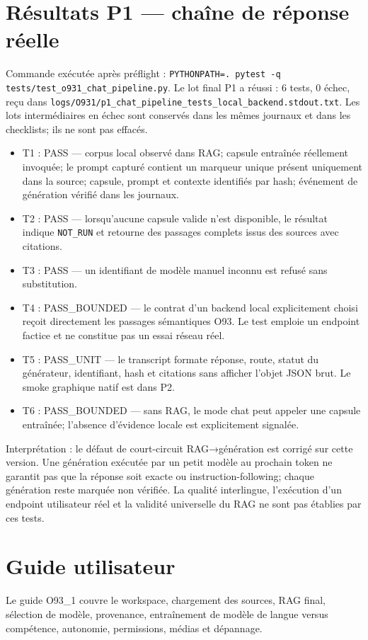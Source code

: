 \documentclass[11pt,a4paper]{article}
\begin{document}
\section{Résultats P1 — chaîne de réponse réelle}
Commande exécutée après préflight : \texttt{PYTHONPATH=. pytest -q tests/test\_o931\_chat\_pipeline.py}. Le lot final P1 a réussi : 6 tests, 0 échec, reçu dans \texttt{logs/O931/p1\_chat\_pipeline\_tests\_local\_backend.stdout.txt}. Les lots intermédiaires en échec sont conservés dans les mêmes journaux et dans les checklists; ils ne sont pas effacés.
\begin{itemize}
\item T1 : PASS — corpus local observé dans RAG; capsule entraînée réellement invoquée; le prompt capturé contient un marqueur unique présent uniquement dans la source; capsule, prompt et contexte identifiés par hash; événement de génération vérifié dans les journaux.
\item T2 : PASS — lorsqu'aucune capsule valide n'est disponible, le résultat indique \texttt{NOT\_RUN} et retourne des passages complets issus des sources avec citations.
\item T3 : PASS — un identifiant de modèle manuel inconnu est refusé sans substitution.
\item T4 : PASS\_BOUNDED — le contrat d'un backend local explicitement choisi reçoit directement les passages sémantiques O93. Le test emploie un endpoint factice et ne constitue pas un essai réseau réel.
\item T5 : PASS\_UNIT — le transcript formate réponse, route, statut du générateur, identifiant, hash et citations sans afficher l'objet JSON brut. Le smoke graphique natif est dans P2.
\item T6 : PASS\_BOUNDED — sans RAG, le mode chat peut appeler une capsule entraînée; l'absence d'évidence locale est explicitement signalée.
\end{itemize}
Interprétation : le défaut de court-circuit RAG→génération est corrigé sur cette version. Une génération exécutée par un petit modèle au prochain token ne garantit pas que la réponse soit exacte ou instruction-following; chaque génération reste marquée non vérifiée. La qualité interlingue, l'exécution d'un endpoint utilisateur réel et la validité universelle du RAG ne sont pas établies par ces tests.
\section{Guide utilisateur}
Le guide O93\_1 couvre le workspace, chargement des sources, RAG final, sélection de modèle, provenance, entraînement de modèle de langue versus compétence, autonomie, permissions, médias et dépannage.
\end{document}
